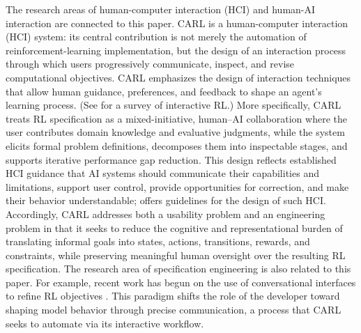 \documentclass[mnsc,sglanonrev]{informs4}
\begin{document}
The research areas of human-computer interaction (HCI) and human-AI interaction are connected to this paper. CARL is a human-computer interaction (HCI)  system: its central contribution is not merely the automation of reinforcement-learning implementation, but the design of an interaction process through which users progressively communicate, inspect, and revise computational objectives. CARL emphasizes the design of interaction techniques that allow human guidance, preferences, and feedback to shape an agent's learning process. (See \cite{arzate_cruz_survey_2020} for a survey of interactive RL.) More specifically, CARL treats RL specification as a mixed-initiative, human--AI collaboration where the user contributes domain knowledge and evaluative judgments, while the system elicits formal problem definitions, decomposes them into inspectable stages, and supports iterative performance gap reduction. This design reflects established HCI guidance that AI systems should communicate their capabilities and limitations, support user control, provide opportunities for correction, and make their behavior understandable;  \cite{amershi_guidelines_2019} offers guidelines for the design of such HCI. Accordingly, CARL addresses both a usability problem and an engineering problem in that it seeks to reduce the cognitive and representational burden of translating informal goals into states, actions, transitions, rewards, and constraints, while preserving meaningful human oversight over the resulting RL specification. The research area of specification engineering is also related to this paper. For example, recent work has begun on the use of conversational interfaces to refine RL objectives \citep{ibrahim_comprehensive_2024}. This paradigm shifts the role of the developer toward shaping model behavior through precise communication, a process that CARL seeks to automate via its interactive workflow.
\end{document}
